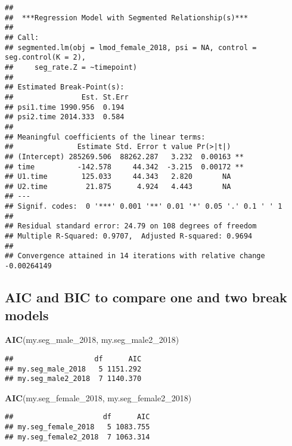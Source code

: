 \documentclass[]{article}
\newenvironment{Shaded}{\begin{snugshade}}{\end{snugshade}}
\newcommand{\KeywordTok}[1]{\textcolor[rgb]{0.13,0.29,0.53}{\textbf{#1}}}
\newcommand{\DecValTok}[1]{\textcolor[rgb]{0.00,0.00,0.81}{#1}}
\newcommand{\NormalTok}[1]{#1}
\begin{document}
\begin{verbatim}
## 
##  ***Regression Model with Segmented Relationship(s)***
## 
## Call: 
## segmented.lm(obj = lmod_female_2018, psi = NA, control = seg.control(K = 2), 
##     seg_rate.Z = ~timepoint)
## 
## Estimated Break-Point(s):
##                Est. St.Err
## psi1.time 1990.956  0.194
## psi2.time 2014.333  0.584
## 
## Meaningful coefficients of the linear terms:
##               Estimate Std. Error t value Pr(>|t|)   
## (Intercept) 285269.506  88262.287   3.232  0.00163 **
## time          -142.578     44.342  -3.215  0.00172 **
## U1.time        125.033     44.343   2.820       NA   
## U2.time         21.875      4.924   4.443       NA   
## ---
## Signif. codes:  0 '***' 0.001 '**' 0.01 '*' 0.05 '.' 0.1 ' ' 1
## 
## Residual standard error: 24.79 on 108 degrees of freedom
## Multiple R-Squared: 0.9707,  Adjusted R-squared: 0.9694 
## 
## Convergence attained in 14 iterations with relative change -0.00264149
\end{verbatim}

\subsection{AIC and BIC to compare one and two break
models}\label{aic-and-bic-to-compare-one-and-two-break-models}

\begin{Shaded}
\begin{Highlighting}[]
\KeywordTok{AIC}\NormalTok{(my.seg_male_}\DecValTok{2018}\NormalTok{, my.seg_male2_}\DecValTok{2018}\NormalTok{)}
\end{Highlighting}
\end{Shaded}

\begin{verbatim}
##                   df      AIC
## my.seg_male_2018   5 1151.292
## my.seg_male2_2018  7 1140.370
\end{verbatim}

\begin{Shaded}
\begin{Highlighting}[]
\KeywordTok{AIC}\NormalTok{(my.seg_female_}\DecValTok{2018}\NormalTok{, my.seg_female2_}\DecValTok{2018}\NormalTok{)}
\end{Highlighting}
\end{Shaded}

\begin{verbatim}
##                     df      AIC
## my.seg_female_2018   5 1083.755
## my.seg_female2_2018  7 1063.314
\end{verbatim}
\end{document}
